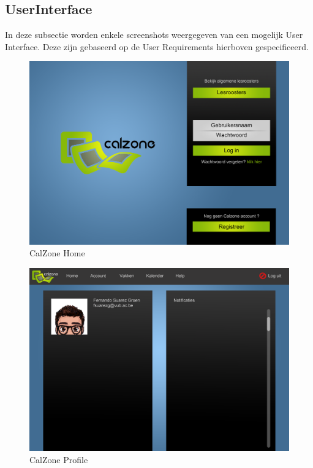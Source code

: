\subsection{UserInterface}

In deze subsectie worden enkele screenshots weergegeven van een mogelijk User Interface. Deze zijn gebaseerd op de User Requirements hierboven gespecificeerd.

\begin{center}


\begin{figure}[H]
\caption{CalZone Home}
\centerline{\includegraphics[scale=0.4]{img/Calzonemain}}
\label{fig:CalZone Home}
\end{figure}

\begin{figure}[H]
\caption{CalZone Profile}
\centerline{\includegraphics[scale=0.4]{img/Calzoneprofile}}
\label{fig:CalZone Profile}
\end{figure}


\end{center}
